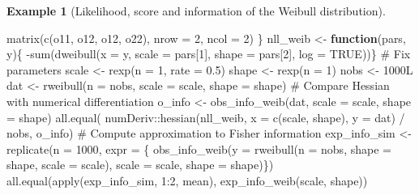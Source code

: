 \documentclass[
  11pt,
  letterpaper,
]{scrbook}
\newenvironment{Shaded}{\begin{snugshade}}{\end{snugshade}}
\newcommand{\AttributeTok}[1]{\textcolor[rgb]{0.40,0.45,0.13}{#1}}
\newcommand{\CommentTok}[1]{\textcolor[rgb]{0.37,0.37,0.37}{#1}}
\newcommand{\ConstantTok}[1]{\textcolor[rgb]{0.56,0.35,0.01}{#1}}
\newcommand{\ControlFlowTok}[1]{\textcolor[rgb]{0.00,0.23,0.31}{\textbf{#1}}}
\newcommand{\DecValTok}[1]{\textcolor[rgb]{0.68,0.00,0.00}{#1}}
\newcommand{\FloatTok}[1]{\textcolor[rgb]{0.68,0.00,0.00}{#1}}
\newcommand{\FunctionTok}[1]{\textcolor[rgb]{0.28,0.35,0.67}{#1}}
\newcommand{\NormalTok}[1]{\textcolor[rgb]{0.00,0.23,0.31}{#1}}
\newcommand{\OtherTok}[1]{\textcolor[rgb]{0.00,0.23,0.31}{#1}}
\newcommand{\SpecialCharTok}[1]{\textcolor[rgb]{0.37,0.37,0.37}{#1}}
\theoremstyle{definition}
\newtheorem{example}{Example}[chapter]
\theoremstyle{plain}
\theoremstyle{plain}
\theoremstyle{plain}
\theoremstyle{definition}
\theoremstyle{definition}
\theoremstyle{plain}
\theoremstyle{plain}
\theoremstyle{remark}
\begin{document}
\begin{example}[Likelihood, score and information of the Weibull
distribution]
\begin{Shaded}
\begin{Highlighting}[]
  \FunctionTok{matrix}\NormalTok{(}\FunctionTok{c}\NormalTok{(o11, o12, o12, o22), }\AttributeTok{nrow =} \DecValTok{2}\NormalTok{, }\AttributeTok{ncol =} \DecValTok{2}\NormalTok{)}
\NormalTok{\}}
\NormalTok{nll\_weib }\OtherTok{\textless{}{-}} \ControlFlowTok{function}\NormalTok{(pars, y)\{}
  \SpecialCharTok{{-}}\FunctionTok{sum}\NormalTok{(}\FunctionTok{dweibull}\NormalTok{(}\AttributeTok{x =}\NormalTok{ y, }\AttributeTok{scale =}\NormalTok{ pars[}\DecValTok{1}\NormalTok{], }\AttributeTok{shape =}\NormalTok{ pars[}\DecValTok{2}\NormalTok{], }\AttributeTok{log =} \ConstantTok{TRUE}\NormalTok{))\}}
\CommentTok{\# Fix parameters}
\NormalTok{scale }\OtherTok{\textless{}{-}} \FunctionTok{rexp}\NormalTok{(}\AttributeTok{n =} \DecValTok{1}\NormalTok{, }\AttributeTok{rate =} \FloatTok{0.5}\NormalTok{)}
\NormalTok{shape }\OtherTok{\textless{}{-}} \FunctionTok{rexp}\NormalTok{(}\AttributeTok{n =} \DecValTok{1}\NormalTok{)}
\NormalTok{nobs }\OtherTok{\textless{}{-}} \DecValTok{1000}\NormalTok{L}
\NormalTok{dat }\OtherTok{\textless{}{-}} \FunctionTok{rweibull}\NormalTok{(}\AttributeTok{n =}\NormalTok{ nobs, }\AttributeTok{scale =}\NormalTok{ scale, }\AttributeTok{shape =}\NormalTok{ shape)}
\CommentTok{\# Compare Hessian with numerical differentiation}
\NormalTok{o\_info }\OtherTok{\textless{}{-}} \FunctionTok{obs\_info\_weib}\NormalTok{(dat, }\AttributeTok{scale =}\NormalTok{ scale, }\AttributeTok{shape =}\NormalTok{ shape)}
\FunctionTok{all.equal}\NormalTok{(}
\NormalTok{  numDeriv}\SpecialCharTok{::}\FunctionTok{hessian}\NormalTok{(nll\_weib, }\AttributeTok{x =} \FunctionTok{c}\NormalTok{(scale, shape), }\AttributeTok{y =}\NormalTok{ dat) }\SpecialCharTok{/}\NormalTok{ nobs,}
\NormalTok{  o\_info)}
\CommentTok{\# Compute approximation to Fisher information}
\NormalTok{exp\_info\_sim }\OtherTok{\textless{}{-}} \FunctionTok{replicate}\NormalTok{(}\AttributeTok{n =} \DecValTok{1000}\NormalTok{, }\AttributeTok{expr =}\NormalTok{ \{}
  \FunctionTok{obs\_info\_weib}\NormalTok{(}\AttributeTok{y =} \FunctionTok{rweibull}\NormalTok{(}\AttributeTok{n =}\NormalTok{ nobs,}
                        \AttributeTok{shape =}\NormalTok{ shape,}
                        \AttributeTok{scale =}\NormalTok{ scale),}
           \AttributeTok{scale =}\NormalTok{ scale, }\AttributeTok{shape =}\NormalTok{ shape)\})}
\FunctionTok{all.equal}\NormalTok{(}\FunctionTok{apply}\NormalTok{(exp\_info\_sim, }\DecValTok{1}\SpecialCharTok{:}\DecValTok{2}\NormalTok{, mean),}
          \FunctionTok{exp\_info\_weib}\NormalTok{(scale, shape))}
\end{Highlighting}
\end{Shaded}

\end{example}
\end{document}
